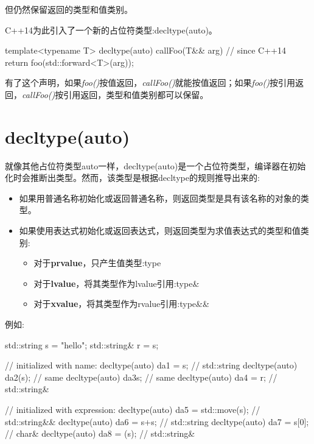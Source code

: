 但仍然保留返回的类型和值类别。\par

C++14为此引入了一个新的占位符类型:decltype(auto)。\par

\begin{codebox}[cpp]
template<typename T>
decltype(auto) callFoo(T&& arg) // since C++14
{
  return foo(std::forward<T>(arg));
}
\end{codebox}

有了这个声明，如果\textit{foo()}按值返回，\textit{callFoo()}就能按值返回；如果\textit{foo()}按引用返回，\textit{callFoo()}按引用返回，类型和值类别都可以保留。\par


\section{decltype(auto)}

就像其他占位符类型auto一样，decltype(auto)是一个占位符类型，编译器在初始化时会推断出类型。然而，该类型是根据decltype的规则推导出来的:\par

\begin{itemize}
  \item 如果用普通名称初始化或返回普通名称，则返回类型是具有该名称的对象的类型。
  \item 如果使用表达式初始化或返回表达式，则返回类型为求值表达式的类型和值类别:
  \begin{itemize}
    \item[-] 对于\textbf{prvalue}，只产生值类型:type
    \item[-] 对于\textbf{lvalue}，将其类型作为lvalue引用:type\&
    \item[-] 对于\textbf{xvalue}，将其类型作为rvalue引用:type\&\&
  \end{itemize}
\end{itemize}

例如:\par

\begin{codebox}[cpp]
std::string s = "hello";
std::string& r = s;

// initialized with name:
decltype(auto) da1 = s; // std::string
decltype(auto) da2(s); // same
decltype(auto) da3{s}; // same
decltype(auto) da4 = r; // std::string&

// initialized with expression:
decltype(auto) da5 = std::move(s); // std::string&&
decltype(auto) da6 = s+s; // std::string
decltype(auto) da7 = s[0]; // char&
decltype(auto) da8 = (s); // std::string&
\end{codebox}

